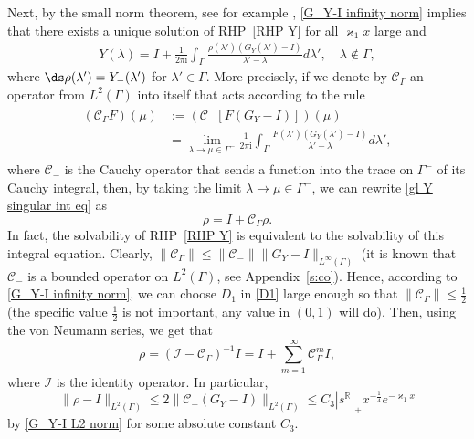 \documentclass[a4paper,10pt,leqno]{amsart}
\numberwithin{equation}{subsection}
\theoremstyle{plain}
\theoremstyle{definition}
\theoremstyle{remark}
\theoremstyle{case}
\newcommand{\R}{\mathbb R}
\newcommand{\ii}{\mathrm{i}}
\begin{document}
Next, by the small norm theorem, see for example \cite[Theorem~8.1]{FIKN}, \eqref{G_Y-I infinity norm} implies that there exists a unique solution of RHP~\ref{RHP Y} for all $\varkappa_1 x$ large and
\begin{align}
    Y(\lambda) = I + \frac{1}{2 \pi \ii} \int_\Gamma \frac{\rho(\lambda')(G_{Y}(\lambda') - I)}{\lambda' - \lambda} d\lambda', \quad \lambda \notin \Gamma, \label{gl Y singular int eq}
\end{align}
where $\ds \rho(\lambda') = Y_-(\lambda^\prime)$ for $\lambda' \in \Gamma$. More precisely, if we denote by \( \mathcal C_\Gamma \) an operator from \( L^2(\Gamma)\) into itself that acts according to the rule
\begin{align}
\label{operator C Gamma}
\begin{aligned}
(\mathcal C_\Gamma F)(\mu) &:= \left(\mathcal C_- \left[ F(G_Y - I) \right] \right) (\mu)\\
&= \lim_{\lambda\to\mu\in \Gamma^-}\frac{1}{2 \pi \ii} \int_\Gamma \frac{F(\lambda')(G_{Y}(\lambda') - I)}{\lambda' - \lambda} d\lambda',
\end{aligned}
\end{align}
where \( \mathcal C_- \) is the Cauchy operator that sends a function into the trace on \( \Gamma^- \) of its Cauchy integral, then, by taking the limit \( \lambda\to\mu\in\Gamma^- \), we can rewrite \eqref{gl Y singular int eq} as
\[
\rho = I + \mathcal C_\Gamma \rho.
\]
In fact, the solvability of RHP~\ref{RHP Y} is equivalent to the solvability of this integral equation. Clearly, \( \|\mathcal C_\Gamma \| \leq \|\mathcal C_- \| \|G_Y-I\|_{L^\infty(\Gamma)} \)  (it is known that \( \mathcal C_- \) is a bounded operator on \( L^2(\Gamma)\), see Appendix~\ref{s:co}). Hence, according to \eqref{G_Y-I infinity norm}, we can choose \( D_1 \) in \eqref{D1} large enough so that \(\|\mathcal C_\Gamma \|\leq \tfrac12\) (the specific value \(\tfrac12\) is not important, any value in \( (0,1)\) will do). Then, using the von Neumann series, we get that
\begin{equation}
\label{von Neumann}
\rho = (\mathcal I-\mathcal C_\Gamma)^{-1}I = I + \sum_{m=1}^\infty \mathcal C_\Gamma^m I,
\end{equation}
where \( \mathcal I\) is the identity operator. In particular,
\begin{equation}
\label{gl rho_Y - I has a small norm}
\|\rho - I\|_{L^2(\Gamma)} \leq 2 \|\mathcal C_- (G_Y-I)\|_{L^2(\Gamma)} \leq C_3 |s^\R|_+ x^{-\frac14}e^{-\varkappa_1x}
\end{equation}
by \eqref{G_Y-I L2 norm} for some absolute constant \( C_3 \). 
\end{document}
